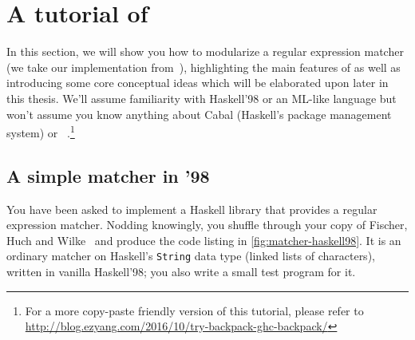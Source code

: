 \chapter{A tutorial of \Backpack{}}
\label{sec:tour}


In this section, we will show you how to modularize a
regular expression matcher
(we take our implementation from~\cite{Fischer:2010:PRE:1863543.1863594}),
highlighting the main
features of \Backpack{} as well as introducing some core conceptual
ideas which will be elaborated upon later in this thesis.  We'll assume
familiarity with Haskell'98 or an ML-like language but won't assume you
know anything about Cabal (Haskell's package management system) or
\OldBackpack{}~\cite{backpack}.\footnote{For a more copy-paste friendly
version of this tutorial, please refer to \url{http://blog.ezyang.com/2016/10/try-backpack-ghc-backpack/}}

\section{A simple matcher in '98}

You have been asked to implement a Haskell library that provides a
regular expression matcher.  Nodding knowingly, you shuffle through your
copy of Fischer, Huch and Wilke~\cite{Fischer:2010:PRE:1863543.1863594}
and produce the code listing in \cref{fig:matcher-haskell98}.  It
is an ordinary matcher on Haskell's \verb|String| data type
(linked lists of characters), written in vanilla
Haskell'98; you also write a small test program for it.

